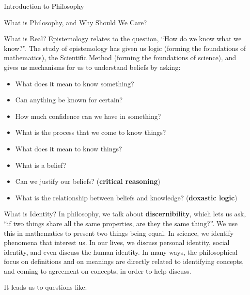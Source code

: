 \begin{chapter}{Introduction to Philosophy}
\begin{section}{What is Philosophy, and Why Should We Care?}
        \begin{subsection}{What is Real?}
            Epistemology relates to the question, “How do we know what we know?”. The study     of epistemology has given us logic (forming the foundations of mathematics),     the Scientific Method (forming the foundations of science), and gives us     mechanisms for us to understand beliefs by asking:
                
            \begin{itemize}
                \item What does it mean to know something?
                \item Can anything be known for certain? 
                \item How much confidence can we have in something?
                \item What is the process that we come to know things?
                \item What does it mean to know things?
                \item What is a belief?
                \item Can we justify our beliefs? (\textbf{critical reasoning})
                \item What is the relationship between beliefs and knowledge?     (\textbf{doxastic logic})
            \end{itemize}
        \end{subsection}
            
        \begin{subsection}{What is Identity?}
            In philosophy, we talk about \textbf{discernibility}, which lets us ask, “if two things share all the same properties, are they the same thing?”. We use this in mathematics to present two things being equal. In science, we identify phenomena that interest us. In our lives, we discuss personal identity, social identity, and even discuss the human identity. In many ways, the philosophical focus on definitions and on meanings are directly related to identifying concepts, and coming to agreement on concepts, in order to help discuss.
                
            It leads us to questions like:
                

\end{subsection}
\end{section}
\end{chapter}
